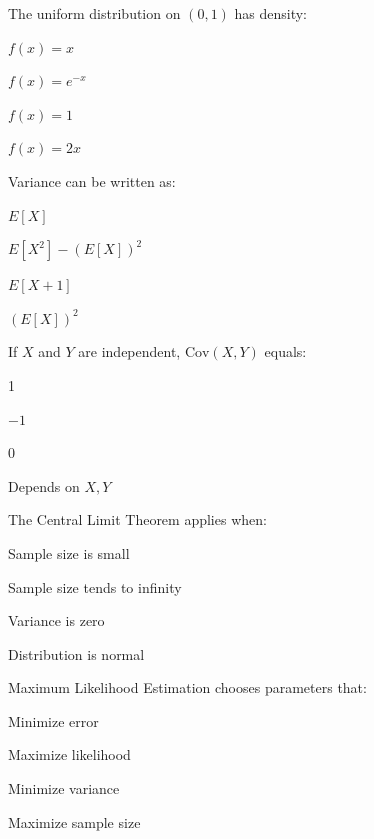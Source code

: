 \documentclass{USTBExam}
\begin{document}
\begin{question}
The uniform distribution on $(0,1)$ has density:
\paren
\begin{choices}
\item $f(x)=x$
\item $f(x)=e^{-x}$
\item $f(x)=1$
\item $f(x)=2x$
\end{choices}
\end{question}

\begin{question}
Variance can be written as:
\paren
\begin{choices}
\item $E[X]$
\item $E[X^2]-(E[X])^2$
\item $E[X+1]$
\item $(E[X])^2$
\end{choices}
\end{question}

\begin{question}
If $X$ and $Y$ are independent, $\mathrm{Cov}(X,Y)$ equals:
\paren
\begin{choices}
\item 1
\item $-1$
\item 0
\item Depends on $X,Y$
\end{choices}
\end{question}

\begin{question}
The Central Limit Theorem applies when:
\paren
\begin{choices}
\item Sample size is small
\item Sample size tends to infinity
\item Variance is zero
\item Distribution is normal
\end{choices}
\end{question}

\begin{question}
Maximum Likelihood Estimation chooses parameters that:
\paren
\begin{choices}
\item Minimize error
\item Maximize likelihood
\item Minimize variance
\item Maximize sample size
\end{choices}
\end{question}
\end{document}
